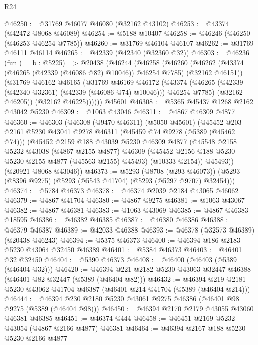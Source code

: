 \begin{lexlean}{R24}
\begin{coremodule}
@46250 := @31769 @46077 @46080 (@32162 @43102)
@46253 := @43374 (@42472 @8068 @46089)
@46254 := @5188 @10407
@46258 := @46246 (@46250 (@46253 @46254 @7785))
@46260 := @31769 @46104 @46107
@46262 := @31769 @46111 @46114
@46265 := @42339 (@42340 (@32360 @32))
@46303 := @46236
    (fun (__b : @5225) =>
    @20438
      (@46244
        (@46258
          (@46260
            (@46262 (@43374 (@46265 (@42339 (@46086 @82) @10046)) @46254 @7785) (@32162 @46151))
            (@31769
              @46162
              @46165
              (@31769
                @46169
                @46172
                (@43374 (@46265 (@42339 (@42340 @32361) (@42339 (@46086 @74) @10046))) @46254 @7785)
                (@32162 @46205))
              (@32162 @46225))))))
    @45601
@46308 := @5365 @45437 @1268 @2162 @43042 @5230
@46309 := @1063 @43046
@46311 := @4867 @46309 @4877
@46360 := @46303
    (@46308
      (@9470 @46311)
      (@5050 @45601)
      (@45452
        @203
        @2161
        @5230
        @43041
        @9278
        @46311
        (@45459 @74 @9278 (@5389 (@45462 @74)))
        (@45452
          @2159
          @188
          @43039
          @5230
          @46309
          @4877
          (@45548
            @2158
            @5232
            @43038
            (@4867 @2155 @4877)
            @46309
            (@45452 @2156 @188 @5230 @5230 @2155 @4877 (@45563 @2155) @45493)
            (@10333 @2154))
          @45493))
      (@20921 @8068 @43046))
@46373 := @5293
    (@8708 (@293 @46073))
    (@5293 (@8396 @9275) (@5293 (@5543 @41704) (@5293 (@5297 @9707) @32454)))
@46374 := @5784 @46373
@46378 := @46374 @2039 @2184 @43065 @46062
@46379 := @4867 @41704
@46380 := @4867 @9275
@46381 := @1063 @43067
@46382 := @4867 @46381
@46383 := @1063 @43069
@46385 := @4867 @46383 @18595
@46386 := @46382 @46385
@46387 := @46380 @46386
@46388 := @46379 @46387
@46389 := @42033 @46388
@46393 := @46378 (@32573 @46389) (@20438 @46243)
@46394 := @5375 @46373
@46400 := @46394 @186 @2183 @5230 @43064 @32450 @46389
@46401 := @5384 @46373
@46403 := @46401 @32 @32450
@46404 := @5390 @46373
@46408 := @46400 (@46403 (@5389 (@46404 @32)))
@46420 := @46394 @221 @2182 @5230 @43063 @32447 @46388 (@46401 @82 @32447 (@5389 (@46404 @82)))
@46432 := @46394 @219 @2181 @5230 @43062 @41704 @46387 (@46401 @214 @41704 (@5389 (@46404 @214)))
@46444 := @46394 @230 @2180 @5230 @43061 @9275 @46386 (@46401 @98 @9275 (@5389 (@46404 @98)))
@46450 := @46394 @2170 @2179 @43055 @43060 @46381 @46385
@46451 := @46374 @444
@46458 := @46451 @2169 @5232 @43054 (@4867 @2166 @4877) @46381
@46464 := @46394 @2167 @188 @5230 @5230 @2166 @4877

\end{coremodule}
\end{lexlean}
